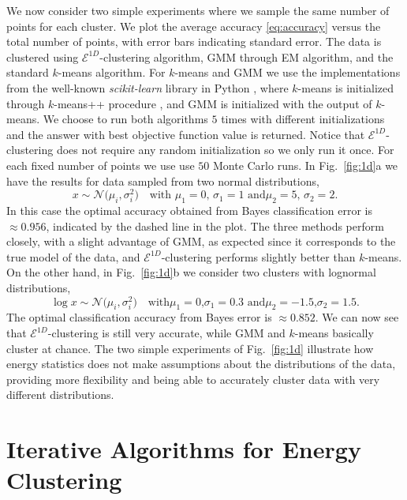 \documentclass[aps,preprint,nofootinbib,floatfix]{revtex4-1}
\begin{document}
We now consider two simple experiments where we sample the same 
number of points for each cluster. 
We plot the average accuracy \eqref{eq:accuracy} versus the 
total number of points, with error bars indicating standard error.
The data is clustered using $\mathcal{E}^{1D}$-clustering algorithm,
GMM through EM algorithm, and the standard $k$-means 
algorithm. For $k$-means and GMM we use the implementations
from the well-known \emph{scikit-learn} library in 
Python \cite{scikit-learn}, where $k$-means is initialized through
$k$-means++ procedure \cite{Vassilvitskii}, and GMM is initialized
with the output of $k$-means. We choose to run both algorithms
$5$ times with different initializations and the answer with best 
objective function value is returned.
Notice that $\mathcal{E}^{1D}$-clustering does not require any random
initialization so we only run it once.
For each fixed number of points we use use $50$ Monte Carlo runs.
In  Fig.~\ref{fig:1d}a 
we have the results for data sampled from two normal distributions, 
\begin{equation}
\label{eq:two_normal}
x \sim \mathcal{N}\big(\mu_i,\sigma_i^2\big) 
\quad 
\mbox{with $\mu_1 = 0$, $\sigma_1=1$ and
$\mu_2 = 5$, $\sigma_2 = 2$.}
\end{equation}
In this case the optimal accuracy 
obtained from Bayes classification error
is $ \approx 0.956$, indicated by the dashed line in the plot.
The three methods
perform closely, with a slight advantage of GMM, as expected since
it corresponds to the true model of the data, and
$\mathcal{E}^{1D}$-clustering performs slightly better
than $k$-means. On the other hand, in Fig.~\ref{fig:1d}b
we consider two clusters with lognormal distributions,
\begin{equation}
\label{eq:two_lognormal}
\log x \sim \mathcal{N}\big( \mu_i,\sigma_i^2\big) \quad
\mbox{with
$\mu_1 = 0$,
$\sigma_1 = 0.3$ and
$\mu_2 = -1.5$,
$\sigma_2 = 1.5$.}
\end{equation}
The optimal classification accuracy from Bayes error is $\approx 0.852$.
We can now see that $\mathcal{E}^{1D}$-clustering
is still  very accurate, while
GMM and $k$-means basically cluster at chance.
The two simple experiments of Fig.~\ref{fig:1d} illustrate
how energy statistics does not make assumptions about the distributions
of the data, providing more flexibility and being able
to accurately cluster data with very different distributions.


\section{Iterative Algorithms for Energy Clustering}
\label{sec:algo}
\end{document}
